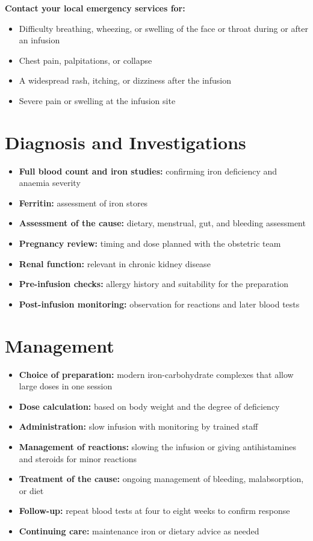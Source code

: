 \textbf{Contact your local emergency services for:}
\begin{itemize}
    \item Difficulty breathing, wheezing, or swelling of the face or throat during or after an infusion
    \item Chest pain, palpitations, or collapse
    \item A widespread rash, itching, or dizziness after the infusion
    \item Severe pain or swelling at the infusion site
\end{itemize}

\section*{Diagnosis and Investigations}
\begin{itemize}
    \item \textbf{Full blood count and iron studies:} confirming iron deficiency and anaemia severity
    \item \textbf{Ferritin:} assessment of iron stores
    \item \textbf{Assessment of the cause:} dietary, menstrual, gut, and bleeding assessment
    \item \textbf{Pregnancy review:} timing and dose planned with the obstetric team
    \item \textbf{Renal function:} relevant in chronic kidney disease
    \item \textbf{Pre-infusion checks:} allergy history and suitability for the preparation
    \item \textbf{Post-infusion monitoring:} observation for reactions and later blood tests
\end{itemize}

\section*{Management}
\begin{itemize}
    \item \textbf{Choice of preparation:} modern iron-carbohydrate complexes that allow large doses in one session
    \item \textbf{Dose calculation:} based on body weight and the degree of deficiency
    \item \textbf{Administration:} slow infusion with monitoring by trained staff
    \item \textbf{Management of reactions:} slowing the infusion or giving antihistamines and steroids for minor reactions
    \item \textbf{Treatment of the cause:} ongoing management of bleeding, malabsorption, or diet
    \item \textbf{Follow-up:} repeat blood tests at four to eight weeks to confirm response
    \item \textbf{Continuing care:} maintenance iron or dietary advice as needed
\end{itemize}

